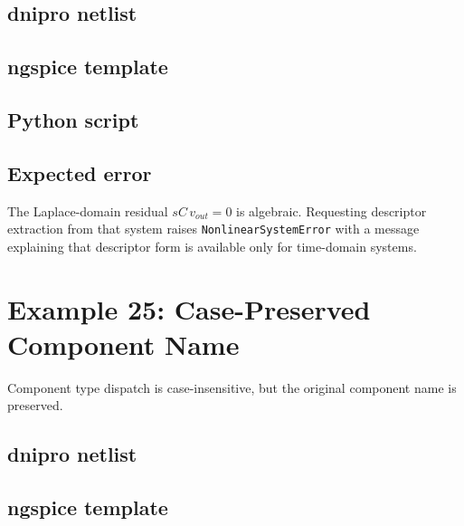 \documentclass[11pt,a4paper]{article}
\newcommand{\code}[1]{\texttt{#1}}
\begin{document}
\subsection{dnipro netlist}



\subsection{ngspice template}



\subsection{Python script}



\subsection{Expected error}

The Laplace-domain residual \(sC\,v_{out}=0\) is algebraic. Requesting
descriptor extraction from that system raises \code{NonlinearSystemError} with a
message explaining that descriptor form is available only for time-domain
systems.

\section{Example 25: Case-Preserved Component Name}
\label{sec:ex-case-preserved}

Component type dispatch is case-insensitive, but the original component name is
preserved.

\subsection{dnipro netlist}



\subsection{ngspice template}
\end{document}
